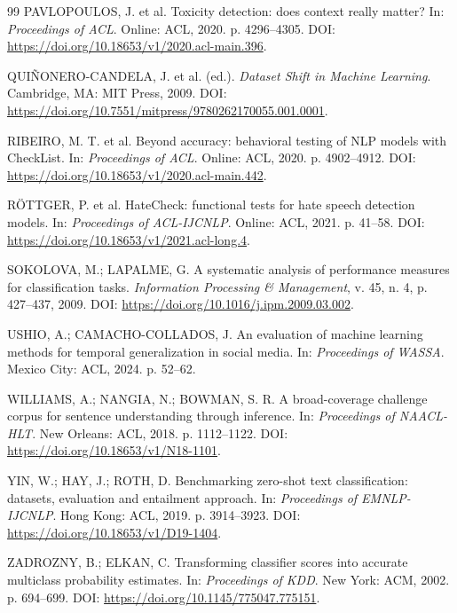 \begin{thebibliography}{99}
PAVLOPOULOS, J. et al. Toxicity detection: does context really matter? In: \emph{Proceedings of ACL}. Online: ACL, 2020. p. 4296--4305. DOI: \url{https://doi.org/10.18653/v1/2020.acl-main.396}.

QUIÑONERO-CANDELA, J. et al. (ed.). \emph{Dataset Shift in Machine Learning}. Cambridge, MA: MIT Press, 2009. DOI: \url{https://doi.org/10.7551/mitpress/9780262170055.001.0001}.

RIBEIRO, M. T. et al. Beyond accuracy: behavioral testing of NLP models with CheckList. In: \emph{Proceedings of ACL}. Online: ACL, 2020. p. 4902--4912. DOI: \url{https://doi.org/10.18653/v1/2020.acl-main.442}.

RÖTTGER, P. et al. HateCheck: functional tests for hate speech detection models. In: \emph{Proceedings of ACL-IJCNLP}. Online: ACL, 2021. p. 41--58. DOI: \url{https://doi.org/10.18653/v1/2021.acl-long.4}.

SOKOLOVA, M.; LAPALME, G. A systematic analysis of performance measures for classification tasks. \emph{Information Processing \& Management}, v. 45, n. 4, p. 427--437, 2009. DOI: \url{https://doi.org/10.1016/j.ipm.2009.03.002}.

USHIO, A.; CAMACHO-COLLADOS, J. An evaluation of machine learning methods for temporal generalization in social media. In: \emph{Proceedings of WASSA}. Mexico City: ACL, 2024. p. 52--62.

WILLIAMS, A.; NANGIA, N.; BOWMAN, S. R. A broad-coverage challenge corpus for sentence understanding through inference. In: \emph{Proceedings of NAACL-HLT}. New Orleans: ACL, 2018. p. 1112--1122. DOI: \url{https://doi.org/10.18653/v1/N18-1101}.

YIN, W.; HAY, J.; ROTH, D. Benchmarking zero-shot text classification: datasets, evaluation and entailment approach. In: \emph{Proceedings of EMNLP-IJCNLP}. Hong Kong: ACL, 2019. p. 3914--3923. DOI: \url{https://doi.org/10.18653/v1/D19-1404}.

ZADROZNY, B.; ELKAN, C. Transforming classifier scores into accurate multiclass probability estimates. In: \emph{Proceedings of KDD}. New York: ACM, 2002. p. 694--699. DOI: \url{https://doi.org/10.1145/775047.775151}.

\end{thebibliography}

